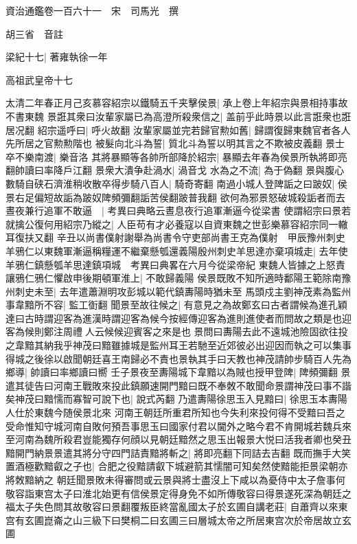 資治通鑑卷一百六十一　宋　司馬光　撰

胡三省　音註

梁紀十七|{
	著雍執徐一年}


高祖武皇帝十七

太清二年春正月己亥慕容紹宗以鐵騎五千夹擊侯景|{
	承上卷上年紹宗與景相持事故不書東魏}
景誑其衆曰汝輩家屬已為高澄所殺衆信之|{
	盖前乎此時景以此言誑衆也誑居况翻}
紹宗遥呼曰|{
	呼火故翻}
汝輩家屬並完若歸官勲如舊|{
	歸謂復歸東魏官者各人先所居之官勲勲階也}
被髮向北斗為誓|{
	質北斗為誓以明其言之不欺被皮義翻}
景士卒不樂南渡|{
	樂音洛}
其將暴顯等各帥所部降於紹宗|{
	暴顯去年春為侯景所執將即亮翻帥讀曰率降戶江翻}
景衆大潰争赴渦水|{
	渦音戈}
水為之不流|{
	為于偽翻}
景與腹心數騎自硖石濟淮稍收散卒得步騎八百人|{
	騎奇寄翻}
南過小城人登陴詬之曰跛奴|{
	侯景右足偏短故詬為跛奴陴頻彌翻詬苦侯翻跛普我翻}
欲何為邪景怒破城殺詬者而去晝夜兼行追軍不敢逼　|{
	考異曰典略云晝息夜行追軍漸逼今從梁書}
使謂紹宗曰景若就擒公復何用紹宗乃縱之|{
	人臣苟有才必養寇以自資東魏之世彭樂慕容紹宗同一轍耳復扶又翻}
辛丑以尚書僕射謝舉為尚書令守吏部尚書王克為僕射　甲辰豫州刺史羊鴉仁以東魏軍漸逼稱糧運不繼棄懸瓠還義陽殷州刺史羊思達亦棄項城走|{
	去年使羊鴉仁鎮懸瓠羊思達鎮項城　考異曰典畧在六月今從梁帝紀}
東魏人皆據之上怒責讓鴉仁鴉仁懼啟申後期頓軍淮上|{
	不敢歸義陽}
侯景既敗不知所適時鄱陽王範除南豫州刺史未至|{
	去年遣蕭淵明攻彭城以範代鎮夀陽時猶未至}
馬頭戍主劉神茂素為監州事韋黯所不容|{
	監工衘翻}
聞景至故往候之|{
	有意見之為故鄭玄曰古者謂候為進孔穎達曰古時謂迎客為進漢時謂迎客為候今按經傳迎客為進則進使者而問故之類是也迎客為候則鄭注周禮人云候候迎賓客之來是也}
景問曰夀陽去此不遠城池險固欲往投之韋黯其納我乎神茂曰黯雖據城是監州耳王若馳至近郊彼必出迎因而執之可以集事得城之後徐以啟聞朝廷喜王南歸必不責也景執其手曰天教也神茂請帥步騎百人先為鄉導|{
	帥讀曰率鄉讀曰嚮}
壬子景夜至夀陽城下韋黯以為賊也授甲登陴|{
	陴頻彌翻}
景遣其徒告曰河南王戰敗來投此鎮願速開門黯曰既不奉敇不敢聞命景謂神茂曰事不諧矣神茂曰黯懦而寡智可說下也|{
	說式芮翻}
乃遣夀陽徐思玉入見黯曰|{
	徐思玉本夀陽人仕於東魏今随侯景北來}
河南王朝廷所重君所知也今失利來投何得不受黯曰吾之受命惟知守城河南自敗何預吾事思玉曰國家付君以閫外之略今君不肯開城若魏兵來至河南為魏所殺君豈能獨存何顔以見朝廷黯然之思玉出報景大悦曰活我者卿也癸丑黯開門納景景遣其將分守四門詰責黯將斬之|{
	將即亮翻下同詰去吉翻}
既而撫手大笑置酒極歡黯叡之子也|{
	合肥之役黯請叡下城避箭其懦闇可知矣然使黯能拒景梁朝亦將敇黯納之}
朝廷聞景敗未得審問或云景與將士盡沒上下咸以為憂侍中太子詹事何敬容詣東宫太子曰淮北始更有信侯景定得身免不如所傳敬容曰得景遂死深為朝廷之福太子失色問其故敬容曰景翻覆叛臣終當亂國太子於玄圃自講老莊|{
	自蕭齊以來東宫有玄圃崑崙之山三級下曰樊桐二曰玄圃三曰層城太帝之所居東宫次於帝居故立玄圃}
